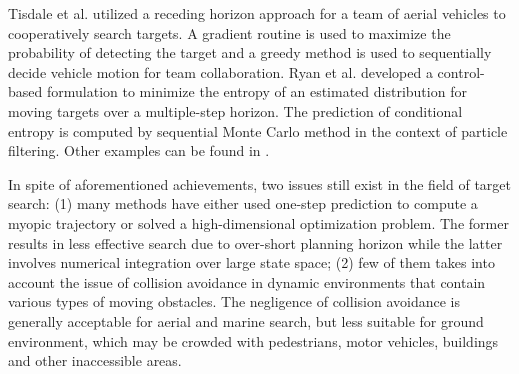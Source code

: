 \documentclass[twocolumn,10pt]{asme2e}
\begin{document}
Tisdale et al. \cite{tisdale2009autonomous} utilized a receding horizon approach for a team of aerial vehicles to cooperatively search targets. 
A gradient routine is used to maximize the probability of detecting the target and a greedy method is used to sequentially decide vehicle motion for team collaboration.
Ryan et al. \cite{ryan2010particle} developed a control-based formulation to minimize the entropy of an estimated distribution for moving targets over a multiple-step horizon.
The prediction of conditional entropy is computed by sequential Monte Carlo method in the context of particle filtering.
Other examples can be found in \cite{kulich2014single,bonnie2012modelling,bertuccelli2006search}.

In spite of aforementioned achievements, two issues still exist in the field of target search:
(1) many methods have either used one-step prediction to compute a myopic trajectory or solved a high-dimensional optimization problem. 
The former results in less effective search due to over-short planning horizon while the latter involves numerical integration over large state space;
(2) few of them takes into account the issue of collision avoidance in dynamic environments that contain various types of moving obstacles.
The negligence of collision avoidance is generally acceptable for aerial and marine search, but less suitable for ground environment, which may be crowded with pedestrians, motor vehicles, buildings and other inaccessible areas.
\end{document}
